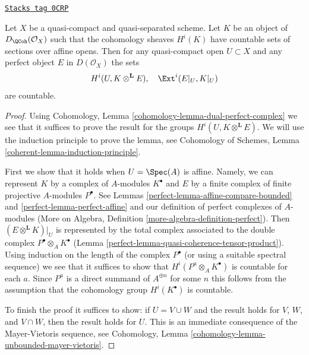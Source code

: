 \begin{lemma}
\label{perfect-lemma-countable-cohomology}
\href{https://stacks.math.columbia.edu/tag/0CRP}{\texttt{Stacks tag 0CRP}}

Let $X$ be a quasi-compact and quasi-separated scheme.
Let $K$ be an object of $D_\QCoh(\mathcal{O}_X)$
such that the cohomology sheaves $H^i(K)$ have countable
sets of sections over affine opens. Then for any quasi-compact open
$U \subset X$ and any perfect object $E$ in $D(\mathcal{O}_X)$
the sets
$$
H^i(U, K \otimes^\mathbf{L} E),\quad \Ext^i(E|_U, K|_U)
$$
are countable.
\end{lemma}

\begin{proof}

Using Cohomology, Lemma \ref{cohomology-lemma-dual-perfect-complex}
we see that it suffices to prove the result
for the groups $H^i(U, K \otimes^\mathbf{L} E)$.
We will use the induction principle to prove the lemma, see
Cohomology of Schemes, Lemma \ref{coherent-lemma-induction-principle}.

\medskip\noindent
First we show that it holds when $U = \Spec(A)$ is affine. Namely, we can
represent $K$ by a complex of $A$-modules $K^\bullet$ and $E$ by a
finite complex of finite projective $A$-modules $P^\bullet$.
See Lemmas \ref{perfect-lemma-affine-compare-bounded} and
\ref{perfect-lemma-perfect-affine}
and our definition of perfect complexes of $A$-modules
(More on Algebra, Definition \ref{more-algebra-definition-perfect}).
Then $(E \otimes^\mathbf{L} K)|_U$ is represented by
the total complex associated to the double complex
$P^\bullet \otimes_A K^\bullet$
(Lemma \ref{perfect-lemma-quasi-coherence-tensor-product}).
Using induction on the length of the complex
$P^\bullet$ (or using a suitable spectral sequence)
we see that it suffices to show that
$H^i(P^a \otimes_A K^\bullet)$ is countable for each $a$.
Since $P^a$ is a direct summand of $A^{\oplus n}$ for
some $n$ this follows from the assumption that
the cohomology group $H^i(K^\bullet)$ is countable.

\medskip\noindent
To finish the proof it suffices to show: if $U = V \cup W$
and the result holds for $V$, $W$, and $V \cap W$, then
the result holds for $U$. This is an immediate consequence
of the Mayer-Vietoris sequence, see
Cohomology, Lemma \ref{cohomology-lemma-unbounded-mayer-vietoris}.
\end{proof}

